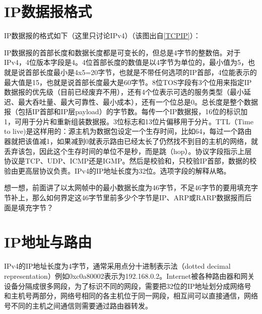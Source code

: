 


\section{IP数据报格式}
%
IP数据报的格式如下（这里只讨论IPv4）（该图出自\hyperlink{db.bi01.bibli.tcpip}{[TCPIP]}）：




IP数据报的首部长度和数据长度都是可变长的，但总是4字节的整数倍。对于IPv4，4位版本字段是4。4位首部长度的数值是以4字节为单位的，最小值为5，也就是说首部长度最小是4x5=\BookSplit{}20字节，也就是不带任何选项的IP首部，4位能表示的最大值是15，也就是说首部长度最大是60字节。8位TOS字段有3个位用来指定IP数据报的优先级（目前已经废弃不用），还有4个位表示可选的服务类型（最小延迟、最大呑吐量、最大可靠性、最小成本），还有一个位总是0。总长度是整个数据报（包括IP首部和IP层payload）的字节数。每传一个IP数据报，16位的标识加1，可用于分片和重新组装数据报。3位标志和13位片偏移用于分片。TTL（Time to live)是这样用的：源主机为数据包设定一个生存时间，比如64，每过一个路由器就把该值减1，如果减到0就表示路由已经太长了仍然找不到目的主机的网络，就丢弃该包，因此这个生存时间的单位不是秒，而是跳（hop）。协议字段指示上层协议是TCP、UDP、ICMP还是IGMP。然后是校验和，只校验IP首部，数据的校验由更高层协议负责。IPv4的IP地址长度为32位。选项字段的解释从略。



想一想，前面讲了以太网帧中的最小数据长度为46字节，不足46字节的要用填充字节补上，那么如何界定这46字节里前多少个字节是IP、ARP或RARP数据报而后面是填充字节？




\section{IP地址与路由}
%
IPv4的IP地址长度为4字节，通常采用点分十进制表示法（dotted decimal representation）例如0xc0a80002表示为192.\BookSplit{}168.\BookSplit{}0.\BookSplit{}2。Internet被各种路由器和网关设备分隔成很多网段，为了标识不同的网段，需要把32位的IP地址划分成网络号和主机号两部分，网络号相同的各主机位于同一网段，相互间可以直接通信，网络号不同的主机之间通信则需要通过路由器转发。



